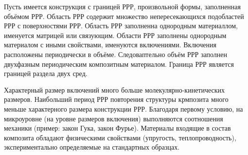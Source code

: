 Пусть имеется конструкция с границей РРР, произвольной формы, заполненная объёмом РРР. 
Область РРР содержит множество непересекающихся подобластей РРР с поверхностями РРР.
Область
РРР
заполненна однородным материаллом, именуется матрицей или связующим.
Области
РРР
заполнены однородным материалом с иными свойствами, именуются включениями.
Включения расположены периодически в объёме.
Следоваптельно объём РРР заполнен двухфазным периодическим композитным материалом.
Граница 
РРР
является границей раздела двух сред.

Характерный размер включений много больше молекулярно-кинетических размеров.
Наибольший период РРР повторения структуры крмпозита много меньше характерного размера конструкции РРР.
Благодаря первому условию, на микроуровне (на уровне размеров включения) выполняются соотношения механики (пример: закон Гука, закон Фурье).
Материалы входящие в состав композита обладают физическими свойствами (упругость, теплопроводность), экспериментально определяемые на стандартных образцах.
